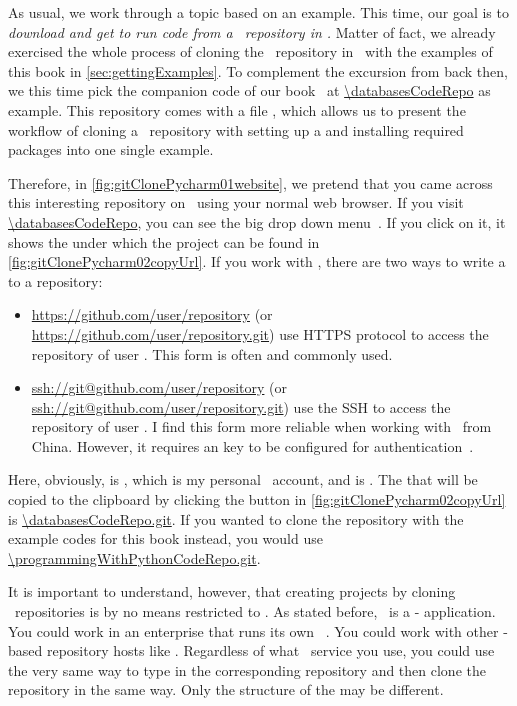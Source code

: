 As usual, we work through a topic based on an example.
This time, our goal is to \emph{download and get to run code from a \github\ repository in \pycharm.}
Matter of fact, we already exercised the whole process of cloning the \github\ repository in \pycharm\ with the examples of this book in \cref{sec:gettingExamples}.
To complement the excursion from back then, we this time pick the companion code of our  book~\cite{databases} at \url{\databasesCodeRepo} as example.
This repository comes with a file , which allows us to present the workflow of cloning a \git\ repository with setting up a  and installing required packages into one single example.

Therefore, in \cref{fig:gitClonePycharm01website}, we pretend that you came across this interesting repository on \github\ using your normal web browser.
If you visit \url{\databasesCodeRepo}, you can see the big drop down menu~.
If you click on it, it shows the   under which the project can be found in \cref{fig:gitClonePycharm02copyUrl}.
If you work with \github, there are two ways to write a  to a repository:%
%
\begin{itemize}%
%
\item \url{https://github.com/user/repository} (or \url{https://github.com/user/repository.git}) use \gls{HTTPS} protocol to access the repository  of user . %
This form is often and commonly used.%
%
\item \url{ssh://git@github.com/user/repository} (or \url{ssh://git@github.com/user/repository.git}) use the \gls{SSH} to access the repository  of user . %
I find this form more reliable when working with \github\ from China. %
However, it requires an  key to be configured for authentication~\cite{GH2025ADCTGWS}.%
%
\end{itemize}%
%
Here, obviously,  is , which is my personal \github\ account, and  is .
The  that will be copied to the clipboard by clicking the button in \cref{fig:gitClonePycharm02copyUrl} is \url{\databasesCodeRepo.git}.
If you wanted to clone the repository with the example codes for this book instead, you would use \url{\programmingWithPythonCodeRepo.git}.

It is important to understand, however, that creating projects by cloning \git\ repositories is by no means restricted to \github.
As stated before, \git\ is a - application.
You could work in an enterprise that runs its own \git\ .
You could work with other \git-based repository hosts like .
Regardless of what \git\ service you use, you could use the very same way to type in the corresponding repository  and then clone the repository in the same way.
Only the structure of the  may be different.

